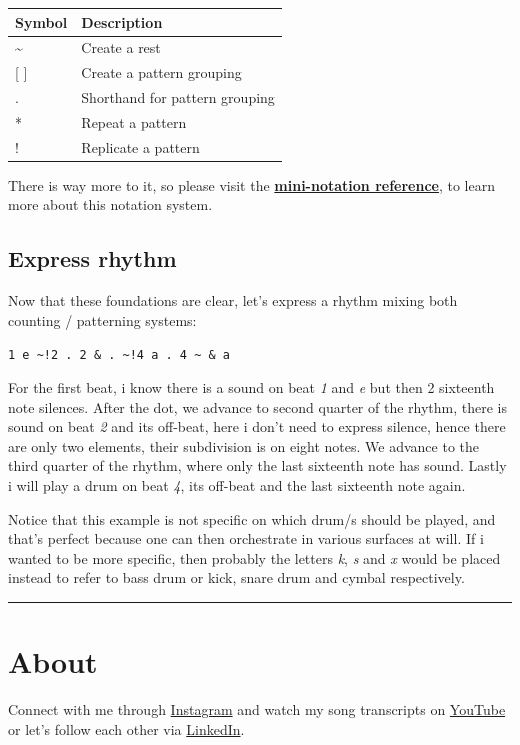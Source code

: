 \documentclass[
]{book}
\begin{document}
\begin{longtable}[]{@{}ll@{}}
\toprule
Symbol & Description \\
\midrule
\endhead
\textasciitilde{} & Create a rest \\
{[} {]} & Create a pattern grouping \\
. & Shorthand for pattern grouping \\
* & Repeat a pattern \\
! & Replicate a pattern \\
\bottomrule
\end{longtable}

There is way more to it, so please visit the \textbf{\href{https://tidalcycles.org/docs/reference/mini_notation}{mini-notation reference}}, to learn more about this notation system.

\hypertarget{express-rhythm}{%
\section*{Express rhythm}\label{express-rhythm}}

Now that these foundations are clear, let's express a rhythm mixing both counting / patterning systems:

\texttt{1\ e\ \textasciitilde{}!2\ .\ 2\ \&\ .\ \textasciitilde{}!4\ a\ .\ 4\ \textasciitilde{}\ \&\ a}

For the first beat, i know there is a sound on beat \emph{1} and \emph{e} but then 2 sixteenth note silences. After the dot, we advance to second quarter of the rhythm, there is sound on beat \emph{2} and its off-beat, here i don't need to express silence, hence there are only two elements, their subdivision is on eight notes. We advance to the third quarter of the rhythm, where only the last sixteenth note has sound. Lastly i will play a drum on beat \emph{4}, its off-beat and the last sixteenth note again.

Notice that this example is not specific on which drum/s should be played, and that's perfect because one can then orchestrate in various surfaces at will. If i wanted to be more specific, then probably the letters \emph{k}, \emph{s} and \emph{x} would be placed instead to refer to bass drum or kick, snare drum and cymbal respectively.

\begin{center}\rule{0.5\linewidth}{0.5pt}\end{center}

\hypertarget{About}{%
\chapter{About}\label{About}}

Connect with me through \href{https://www.instagram.com/isaac.medina/}{Instagram} and watch my song transcripts on \href{https://www.youtube.com/@drumathics}{YouTube} or let's follow each other via \href{https://mx.linkedin.com/in/isaacmedina/es}{LinkedIn}.

  
\end{document}
